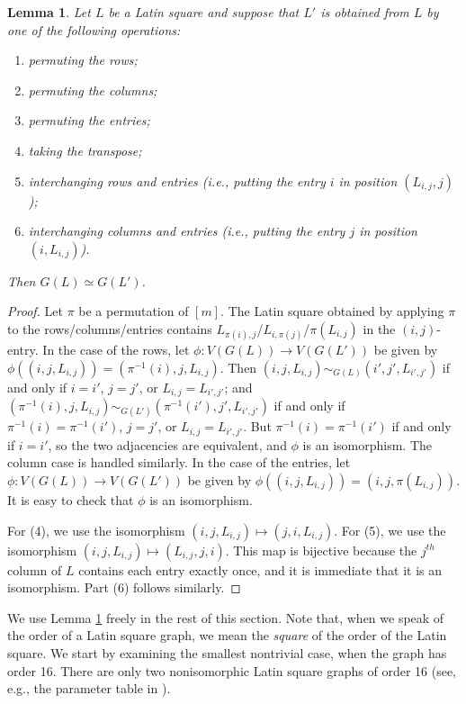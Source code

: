 \documentclass{article}
\newtheorem{lemma}[thm]{Lemma}
\theoremstyle{definition}
\begin{document}
\begin{lemma} \label{Lemma Latin square transformations}
Let $L$ be a Latin square and suppose that $L'$ is obtained from $L$ by one of the following operations:
\begin{enumerate}
    \item permuting the rows;
    \item permuting the columns;
    \item permuting the entries;
    \item taking the transpose;
    \item interchanging rows and entries (i.e., putting the entry $i$ in position $(L_{i,j},j)$);
    \item interchanging columns and entries (i.e., putting the entry $j$ in position $(i,L_{i,j})$).
\end{enumerate}
Then $G(L)\simeq G(L')$.
\end{lemma}
\begin{proof}
Let $\pi$ be a permutation of $[m]$. The Latin square obtained by applying $\pi$ to the rows/columns/entries contains $L_{\pi(i),j}$/$L_{i,\pi(j)}$/$\pi(L_{i,j})$ in the $(i,j)$-entry. In the case of the rows, let $\phi:V(G(L))\to V(G(L'))$ be given by $\phi((i,j,L_{i,j}))=(\pi^{-1}(i),j,L_{i,j})$. Then $(i,j,L_{i,j})\sim_{G(L)}(i',j',L_{i',j'})$ if and only if $i=i'$, $j=j'$, or $L_{i,j}=L_{i',j'}$; and $(\pi^{-1}(i),j,L_{i,j})\sim_{G(L')}(\pi^{-1}(i'),j',L_{i',j'})$ if and only if $\pi^{-1}(i)=\pi^{-1}(i')$, $j=j'$, or $L_{i,j}=L_{i',j'}$. But $\pi^{-1}(i)=\pi^{-1}(i')$ if and only if $i=i'$, so the two adjacencies are equivalent, and $\phi$ is an isomorphism. The column case is handled similarly. In the case of the entries, let $\phi:V(G(L))\to V(G(L'))$ be given by $\phi((i,j,L_{i,j}))=(i,j,\pi(L_{i,j}))$. It is easy to check that $\phi$ is an isomorphism.

For (4), we use the isomorphism $(i,j,L_{i,j})\mapsto(j,i,L_{i,j})$. For (5), we use the isomorphism $(i,j,L_{i,j})\mapsto (L_{i,j},j,i)$. This map is bijective because the $j^{th}$ column of $L$ contains each entry exactly once, and it is immediate that it is an isomorphism. Part (6) follows similarly.
\end{proof}

We use Lemma \ref{Lemma Latin square transformations} freely in the rest of this section. Note that, when we speak of the order of a Latin square graph, we mean the \textit{square} of the order of the Latin square. We start by examining the smallest nontrivial case, when the graph has order 16. There are only two nonisomorphic Latin square graphs of order 16 (see, e.g., the parameter table in \cite{brouwer2022strongly}).
\end{document}
